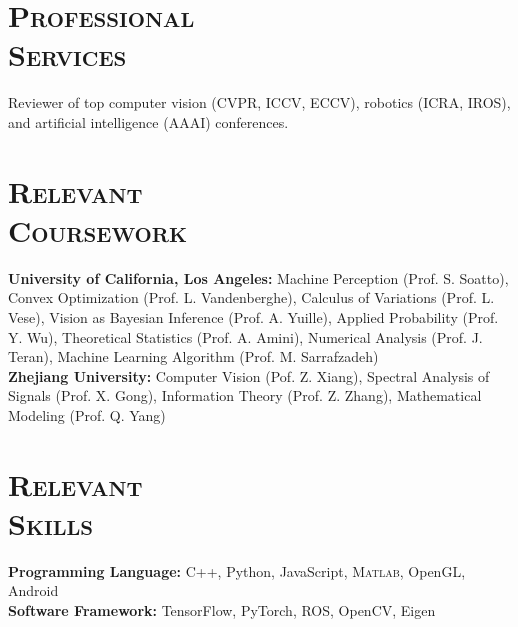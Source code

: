 \documentclass[margin, line, 10pt]{res} %
\begin{document}
\begin{resume}
\section{\textsc{Professional\\Services}}
Reviewer of top computer vision (CVPR, ICCV, ECCV), robotics (ICRA, IROS), and artificial intelligence (AAAI) conferences.



\section{\textsc{Relevant\\Coursework}}
\textbf{University of California, Los Angeles:} Machine Perception (Prof. S. Soatto), Convex Optimization (Prof. L. Vandenberghe), Calculus of Variations (Prof. L. Vese), Vision as Bayesian Inference (Prof. A. Yuille), Applied Probability (Prof. Y. Wu), Theoretical Statistics (Prof. A. Amini), Numerical Analysis (Prof. J. Teran), Machine Learning Algorithm (Prof. M. Sarrafzadeh)\\
\textbf{Zhejiang University:} Computer Vision (Pof. Z. Xiang), Spectral Analysis of Signals (Prof. X. Gong), Information Theory (Prof. Z. Zhang), Mathematical Modeling (Prof. Q. Yang)

\section{\textsc{Relevant\\Skills}}
\textbf{Programming Language:} C++, Python, JavaScript, \textsc{Matlab}, OpenGL, Android\\
\textbf{Software Framework:} TensorFlow, PyTorch, ROS, OpenCV, Eigen


\end{resume}
\end{document}
